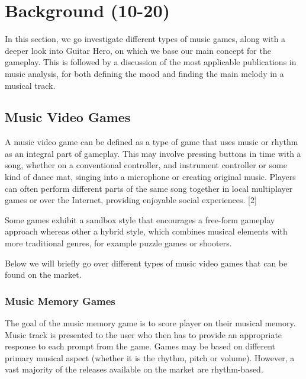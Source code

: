 
\chapter{Background (10-20)} %

\label{Chapter2} %



In this section, we go investigate different types of music games, along with a deeper look into Guitar Hero, on which we base our main concept for the gameplay. This is followed by a discussion of the most applicable publications in music analysis, for both defining the mood and finding the main melody in a musical track.


\section{Music Video Games }

A music video game can be defined as a type of game that uses music or rhythm as an integral part of gameplay. This may involve pressing buttons in time with a song, whether on a conventional controller, and instrument controller or some kind of dance mat, singing into a microphone or creating original music. Players can often perform different parts of the same song together in local multiplayer games or over the Internet, providing enjoyable social experiences. [2]

Some games exhibit a sandbox style that encourages a free-form gameplay approach whereas other a hybrid style, which combines musical elements with more traditional genres, for example puzzle games or shooters. 

Below we will briefly go over different types of music video games that can be found on the market.


\subsection{Music Memory Games}

The goal of the music memory game is to score player on their musical memory. Music track is presented to the user who then has to provide an appropriate response to each prompt from the game. Games may be based on different primary musical aspect (whether it is the rhythm, pitch or volume). However, a vast majority of the releases available on the market are rhythm-based.

